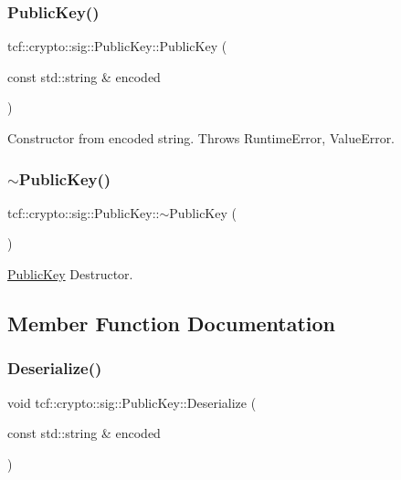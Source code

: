\subsubsection{\texorpdfstring{Public\+Key()}{PublicKey()}\hspace{0.1cm}{\footnotesize\ttfamily [2/2]}}
{\footnotesize\ttfamily tcf\+::crypto\+::sig\+::\+Public\+Key\+::\+Public\+Key (\begin{DoxyParamCaption}\item[{const std\+::string \&}]{encoded }\end{DoxyParamCaption})}

Constructor from encoded string. Throws Runtime\+Error, Value\+Error. \mbox{\label{classtcf_1_1crypto_1_1sig_1_1PublicKey_a3d8af075952ecc7e33757a6b772c87e1}} 
\subsubsection{\texorpdfstring{$\sim$\+Public\+Key()}{~PublicKey()}}
{\footnotesize\ttfamily tcf\+::crypto\+::sig\+::\+Public\+Key\+::$\sim$\+Public\+Key (\begin{DoxyParamCaption}{ }\end{DoxyParamCaption})}

\hyperlink{classtcf_1_1crypto_1_1sig_1_1PublicKey}{Public\+Key} Destructor. 

\subsection{Member Function Documentation}
\mbox{\label{classtcf_1_1crypto_1_1sig_1_1PublicKey_a3d4cdf4a14a8815bd97d924a19320d07}} 
\subsubsection{\texorpdfstring{Deserialize()}{Deserialize()}}
{\footnotesize\ttfamily void tcf\+::crypto\+::sig\+::\+Public\+Key\+::\+Deserialize (\begin{DoxyParamCaption}\item[{const std\+::string \&}]{encoded }\end{DoxyParamCaption})}

